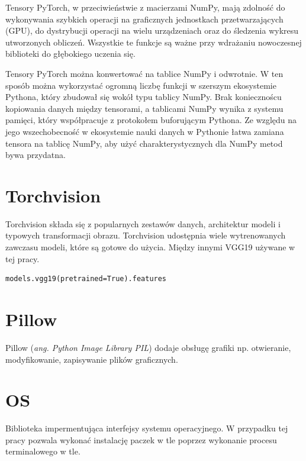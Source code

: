 \documentclass[brudnopis]{xmgr}
\begin{document}
Tensory PyTorch, w przeciwieństwie z macierzami NumPy, mają zdolność do wykonywania szybkich operacji na graficznych jednostkach przetwarzających (GPU), do dystrybucji operacji na wielu urządzeniach oraz do śledzenia wykresu utworzonych obliczeń. Wszystkie te funkcje są ważne przy wdrażaniu nowoczesnej biblioteki do głębokiego uczenia się.


Tensory PyTorch można konwertować na tablice NumPy i odwrotnie. W ten sposób można wykorzystać ogromną liczbę funkcji w szerszym ekosystemie Pythona, który zbudował się wokół typu tablicy NumPy. Brak koniecznoścu kopiowania danych między tensorami, a tablicami NumPy wynika z systemu pamięci, który współpracuje z protokołem buforującym Pythona. 
Ze względu na jego wszechobecność w ekosystemie nauki danych w Pythonie łatwa zamiana tensora na tablicę NumPy, aby użyć charakterystycznych dla NumPy metod bywa przydatna.

    \section{Torchvision\label{s:dsssl}}
    
    Torchvision składa się z popularnych zestawów danych, architektur modeli i typowych transformacji obrazu. Torchvision udostępnia wiele wytrenowanych zawczasu modeli, które są gotowe do użycia. Między innymi VGG19 używane w tej pracy.
    
\begin{lstlisting}
models.vgg19(pretrained=True).features
\end{lstlisting}


\section{Pillow\label{s:dsssl}}
    
   Pillow (\textit{ang. Python Image Library PIL}) dodaje obsługę grafiki np. otwieranie, modyfikowanie, zapisywanie plików graficznych.
   
    
\section{OS\label{s:dsssl}}
        
Biblioteka impermentująca interfejsy systemu operacyjnego. W przypadku tej pracy pozwala wykonać instalację paczek w tle poprzez wykonanie procesu terminalowego w tle. 
\end{document}
